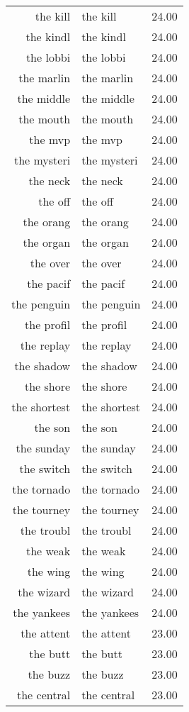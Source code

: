\begin{table}[ht]
\begin{tabular}{rlr}
  the kill & the kill & 24.00 \\ 
  the kindl & the kindl & 24.00 \\ 
  the lobbi & the lobbi & 24.00 \\ 
  the marlin & the marlin & 24.00 \\ 
  the middle & the middle & 24.00 \\ 
  the mouth & the mouth & 24.00 \\ 
  the mvp & the mvp & 24.00 \\ 
  the mysteri & the mysteri & 24.00 \\ 
  the neck & the neck & 24.00 \\ 
  the off & the off & 24.00 \\ 
  the orang & the orang & 24.00 \\ 
  the organ & the organ & 24.00 \\ 
  the over & the over & 24.00 \\ 
  the pacif & the pacif & 24.00 \\ 
  the penguin & the penguin & 24.00 \\ 
  the profil & the profil & 24.00 \\ 
  the replay & the replay & 24.00 \\ 
  the shadow & the shadow & 24.00 \\ 
  the shore & the shore & 24.00 \\ 
  the shortest & the shortest & 24.00 \\ 
  the son & the son & 24.00 \\ 
  the sunday & the sunday & 24.00 \\ 
  the switch & the switch & 24.00 \\ 
  the tornado & the tornado & 24.00 \\ 
  the tourney & the tourney & 24.00 \\ 
  the troubl & the troubl & 24.00 \\ 
  the weak & the weak & 24.00 \\ 
  the wing & the wing & 24.00 \\ 
  the wizard & the wizard & 24.00 \\ 
  the yankees & the yankees & 24.00 \\ 
  the attent & the attent & 23.00 \\ 
  the butt & the butt & 23.00 \\ 
  the buzz & the buzz & 23.00 \\ 
  the central & the central & 23.00 \\ 

\end{tabular}
\end{table}
